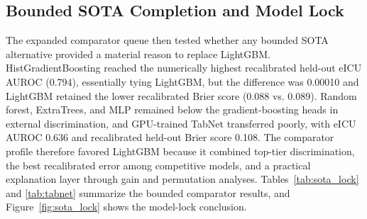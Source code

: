 \documentclass[utf8]{FrontiersinVancouver}
\begin{document}
\subsection{Bounded SOTA Completion and Model Lock}
The expanded comparator queue then tested whether any bounded SOTA alternative provided a material reason to replace LightGBM. HistGradientBoosting reached the numerically highest recalibrated held-out eICU AUROC (0.794), essentially tying LightGBM, but the difference was 0.00010 and LightGBM retained the lower recalibrated Brier score (0.088 vs. 0.089). Random forest, ExtraTrees, and MLP remained below the gradient-boosting heads in external discrimination, and GPU-trained TabNet transferred poorly, with eICU AUROC 0.636 and recalibrated held-out Brier score 0.108. The comparator profile therefore favored LightGBM because it combined top-tier discrimination, the best recalibrated error among competitive models, and a practical explanation layer through gain and permutation analyses. Tables~\ref{tab:sota_lock} and \ref{tab:tabnet} summarize the bounded comparator results, and Figure~\ref{fig:sota_lock} shows the model-lock conclusion.

\begin{table}[htbp]
\centering
\caption{Bounded SOTA completion and GERI-NutriRisk-ICU model-lock comparison. Bold values indicate the best value in each displayed metric column; lower Brier score is better.}
\label{tab:sota_lock}
\end{table}
\end{document}
